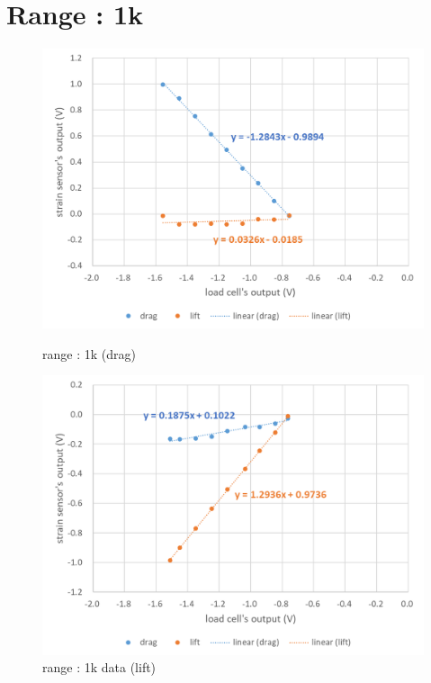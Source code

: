 \documentclass[a4paper]{jsarticle}
\begin{document}
\section{Range : 1k}
\begin{figure}[htbp]
    \footnotesize
    \begin{center}
        \includegraphics[width=130mm]{../images/1k_drag.png}
        \caption{range : 1k (drag)}
        \includegraphics[width=130mm]{../images/1k_lift.png}
        \caption{range : 1k data (lift)}
    \end{center}
\end{figure}
\newpage
\end{document}
